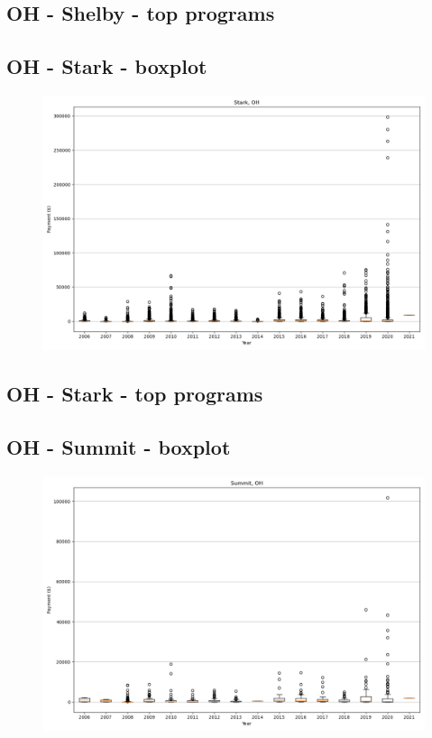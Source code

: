 \subsection*{OH - Shelby - top programs}

\newpage
\subsection*{OH - Stark - boxplot}
\begin{figure}[h]
\centering
\includegraphics[width=7in]{../output/boxplots/counties/Stark-OH_boxplot.png}
\end{figure}


\subsection*{OH - Stark - top programs}

\newpage
\subsection*{OH - Summit - boxplot}
\begin{figure}[h]
\centering
\includegraphics[width=7in]{../output/boxplots/counties/Summit-OH_boxplot.png}
\end{figure}


